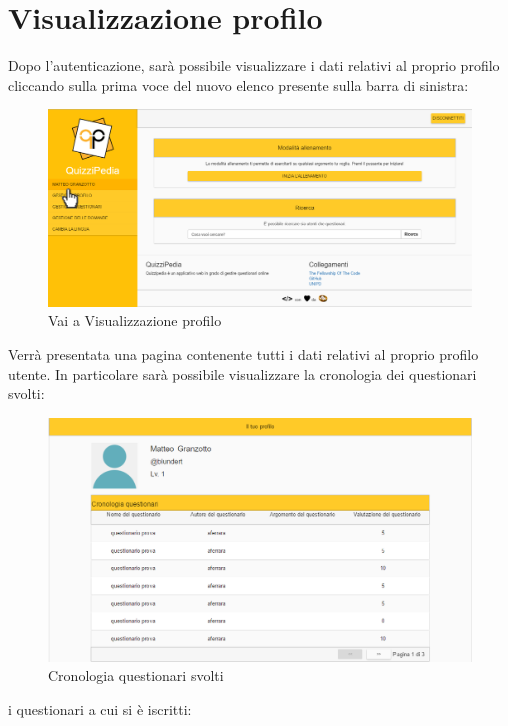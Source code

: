 \newpage
\section{Visualizzazione profilo}
Dopo l'autenticazione, sarà possibile visualizzare i dati relativi al proprio profilo cliccando sulla prima voce del nuovo elenco presente sulla barra di sinistra:

\label{VaiProfilo}
\begin{figure}[ht]
	\centering
	\includegraphics[scale=0.33]{img/vai_profilo.png}
	\caption{Vai a Visualizzazione profilo}
\end{figure}
\FloatBarrier

Verrà presentata una pagina contenente tutti i dati relativi al proprio profilo utente. In particolare sarà possibile visualizzare la cronologia dei questionari svolti:

\label{CronologiaQuestionari}
\begin{figure}[ht]
	\centering
	\includegraphics[scale=0.40]{img/cronologia_questionari.png}
	\caption{Cronologia questionari svolti}
\end{figure}
\FloatBarrier

i questionari a cui si è iscritti: 

